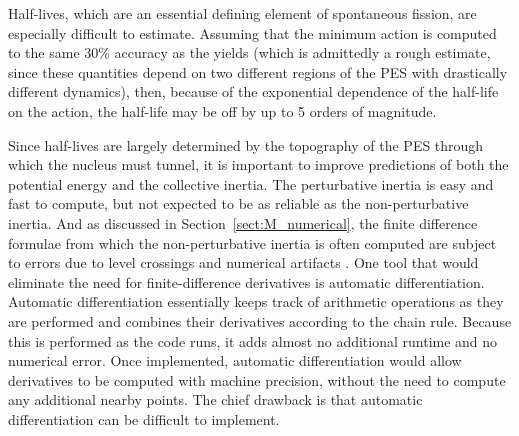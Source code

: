 Half-lives, which are an essential defining element of spontaneous fission, are especially difficult to estimate. Assuming that the minimum action is computed to the same 30\% accuracy as the yields (which is admittedly a rough estimate, since these quantities depend on two different regions of the PES with drastically different dynamics), then, because of the exponential dependence of the half-life on the action, the half-life may be off by up to 5 orders of magnitude.



Since half-lives are largely determined by the topography of the PES through which the nucleus must tunnel, it is important to improve predictions of both the potential energy and the collective inertia. The perturbative inertia is easy and fast to compute, but not expected to be as reliable as the non-perturbative inertia. And as discussed in Section~\ref{sect:M_numerical}, the finite difference formulae from which the non-perturbative inertia is often computed are subject to errors due to level crossings and numerical artifacts . One tool that would eliminate the need for finite-difference derivatives is automatic differentiation. Automatic differentiation essentially keeps track of arithmetic operations as they are performed and combines their derivatives according to the chain rule. Because this is performed as the code runs, it adds almost no additional runtime and no numerical error. Once implemented, automatic differentiation would allow derivatives to be computed with machine precision, without the need to compute any additional nearby points. The chief drawback is that automatic differentiation can be difficult to implement.

